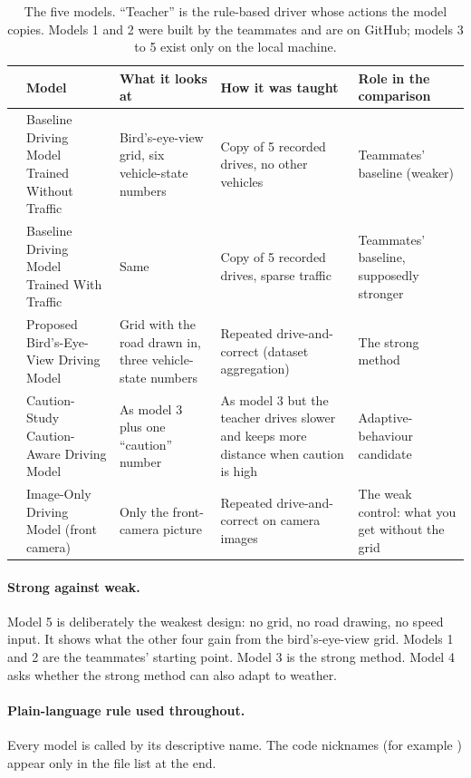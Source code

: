 \documentclass[11pt,a4paper]{article}
\begin{document}
\begin{table}[H]\centering\small
\caption{The five models. ``Teacher'' is the rule-based driver whose actions the model copies. Models 1 and 2 were built by the teammates and are on GitHub; models 3 to 5 exist only on the local machine.}\label{tab:fivemodels}
\begin{tabularx}{\textwidth}{@{}>{\raggedright\arraybackslash}p{0.5cm}>{\raggedright\arraybackslash}p{3.7cm}>{\raggedright\arraybackslash}p{3.3cm}>{\raggedright\arraybackslash}p{3.6cm}X@{}}\toprule
 & Model & What it looks at & How it was taught & Role in the comparison\\\midrule
1 & Baseline Driving Model Trained Without Traffic & Bird's-eye-view grid, six vehicle-state numbers & Copy of 5 recorded drives, no other vehicles & Teammates' baseline (weaker)\\
2 & Baseline Driving Model Trained With Traffic & Same & Copy of 5 recorded drives, sparse traffic & Teammates' baseline, supposedly stronger\\
3 & Proposed Bird's-Eye-View Driving Model & Grid with the road drawn in, three vehicle-state numbers & Repeated drive-and-correct (dataset aggregation) & The strong method\\
4 & Caution-Study Caution-Aware Driving Model & As model 3 plus one ``caution'' number & As model 3 but the teacher drives slower and keeps more distance when caution is high & Adaptive-behaviour candidate\\
5 & Image-Only Driving Model (front camera) & Only the front-camera picture & Repeated drive-and-correct on camera images & The weak control: what you get without the grid\\\bottomrule
\end{tabularx}
\end{table}

\paragraph{Strong against weak.} Model 5 is deliberately the weakest design: no grid, no road drawing, no speed input. It shows what the other four gain from the bird's-eye-view grid. Models 1 and 2 are the teammates' starting point. Model 3 is the strong method. Model 4 asks whether the strong method can also adapt to weather.
\paragraph{Plain-language rule used throughout.} Every model is called by its descriptive name. The code nicknames (for example ) appear only in the file list at the end.
\end{document}
